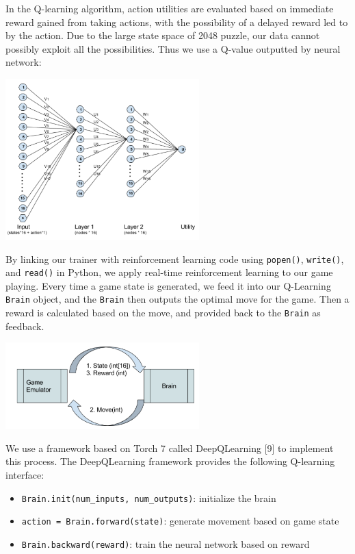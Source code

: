 \documentclass[9pt,twocolumn]{article}
\begin{document}
In the Q-learning algorithm, action utilities are evaluated based on immediate reward gained from taking actions, with the possibility of a delayed reward led to by the action. Due to the large state space of 2048 puzzle, our data cannot possibly exploit all the possibilities. Thus we use a Q-value outputted by neural network:

\begin{centering}

\includegraphics[width=75mm]{rl_nodes.png}

\end{centering}

By linking our trainer with reinforcement learning code using \texttt{popen()}, \texttt{write()}, and \texttt{read()} in Python, we apply real-time reinforcement learning to our game playing. Every time a game state is generated, we feed it into our Q-Learning \texttt{Brain} object, and the \texttt{Brain} then outputs the optimal move for the game. Then a reward is calculated based on the move, and provided back to the \texttt{Brain} as feedback.

\begin{centering}

\includegraphics[width=75mm]{rl_state.png}

\end{centering}

We use a framework based on Torch 7 called DeepQLearning [9] to implement this process. The DeepQLearning framework provides the following Q-learning interface:

\begin{itemize}

\item \texttt{Brain.init(num\_inputs, num\_outputs)}: initialize the brain

\item \texttt{action = Brain.forward(state)}: generate movement based on game state

\item \texttt{Brain.backward(reward)}: train the neural network based on reward

\end{itemize}
\end{document}
